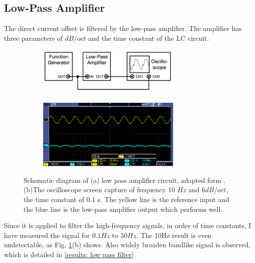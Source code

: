 \documentclass{article}
\begin{document}
\subsection{Low-Pass Amplifier}
 The direct current offset is filtered by the low-pass amplifier.
 The amplifier has three parameters of $dB/oct$ and the time constant of the LC circuit.

 \begin{figure}[ht]
    \centering
    \begin{subfigure}[b]{7cm}
        \centering
        \includegraphics[width=7cm]{../results/low_pass_amplifier_circuit.png}
        \caption{}
    \end{subfigure}
    \hfill
    \begin{subfigure}[b]{7cm}
        \centering
        \includegraphics[width=7cm]{../raw_data/TEK00453.PNG}
        \caption{}
    \end{subfigure}
    \hfill
    \caption{Schematic diagram of (a) low pass amplifier circuit, adapted form  \cite{signal_processor}.
    (b)The oscilloscope screen capture of frequency 10 $Hz$ and $6 dB/oct$, the time constant of 0.1 s.
    The yellow line is the reference input and the blue line is the low-pass amplifier output which performs well.
    }
    \label{fig: low_pass_amplifier_circuit}
  \end{figure}

 Since it is applied to filter the high-frequency signals, in order of time constants, I have measured the signal for $0.1Hz$ to $50Hz$.
 The 10Hz result is even undetectable, as Fig. \ref{fig: low_pass_amplifier_circuit}(b) shows.
 Also widely broaden bandlike signal is observed, which is detailed in \ref{results: low pass filter}
\end{document}
